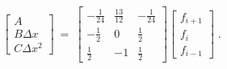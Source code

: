 \begin{equation}
\left[ \begin{array}{c}
A \\ B\Delta x \\ C \Delta x^2
\end{array} \right] \: = \:
\left[ \begin{array}{ccc}
-\frac{1}{24} & \frac{13}{12} & -\frac{1}{24} \\ -\frac{1}{2} & 0 & \frac{1}{2} \\
\frac{1}{2} & -1 & \frac{1}{2}
\end{array} \right]
\left[ \begin{array}{ccc}
f_{i+1} \\ f_{i} \\ f_{i-1}
\end{array} \right] \; .
\end{equation}

